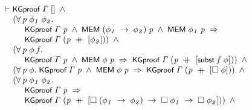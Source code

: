 \documentclass{report}
\renewcommand{\HOLConst}[1]{{\textsf{\upshape\small #1}}}
\newenvironment{holmath}{\begin{displaymath}\begin{array}{l}}{\end{array}\end{displaymath}\ignorespacesafterend}
\begin{document}
\begin{holmath}
  \ensuremath{\HOLTokenTurnstile}\HOLConst{KGproof}\;\HOLFreeVar{\ensuremath{\Gamma}}\;[]\;\HOLSymConst{\HOLTokenConj{}}\\
\;\;\;\;\;(\HOLSymConst{\HOLTokenForall{}}\HOLBoundVar{p}\;\HOLBoundVar{\ensuremath{\phi\sb{1}}}\;\HOLBoundVar{\ensuremath{\phi\sb{2}}}.\\
\;\;\;\;\;\;\;\;\;\;\HOLConst{KGproof}\;\HOLFreeVar{\ensuremath{\Gamma}}\;\HOLBoundVar{p}\;\HOLSymConst{\HOLTokenConj{}}\;\HOLConst{MEM}\;(\HOLBoundVar{\ensuremath{\phi\sb{1}}}\;\HOLSymConst{\ensuremath{\rightarrow}}\;\HOLBoundVar{\ensuremath{\phi\sb{2}}})\;\HOLBoundVar{p}\;\HOLSymConst{\HOLTokenConj{}}\;\HOLConst{MEM}\;\HOLBoundVar{\ensuremath{\phi\sb{1}}}\;\HOLBoundVar{p}\;\HOLSymConst{\HOLTokenImp{}}\\
\;\;\;\;\;\;\;\;\;\;\HOLConst{KGproof}\;\HOLFreeVar{\ensuremath{\Gamma}}\;(\HOLBoundVar{p}\;\HOLSymConst{\HOLTokenDoublePlus}\;[\HOLBoundVar{\ensuremath{\phi\sb{2}}}]))\;\HOLSymConst{\HOLTokenConj{}}\\
\;\;\;\;\;(\HOLSymConst{\HOLTokenForall{}}\HOLBoundVar{p}\;\HOLBoundVar{\ensuremath{\phi}}\;\HOLBoundVar{f}.\\
\;\;\;\;\;\;\;\;\;\;\HOLConst{KGproof}\;\HOLFreeVar{\ensuremath{\Gamma}}\;\HOLBoundVar{p}\;\HOLSymConst{\HOLTokenConj{}}\;\HOLConst{MEM}\;\HOLBoundVar{\ensuremath{\phi}}\;\HOLBoundVar{p}\;\HOLSymConst{\HOLTokenImp{}}\;\HOLConst{KGproof}\;\HOLFreeVar{\ensuremath{\Gamma}}\;(\HOLBoundVar{p}\;\HOLSymConst{\HOLTokenDoublePlus}\;[\HOLConst{subst}\;\HOLBoundVar{f}\;\HOLBoundVar{\ensuremath{\phi}}]))\;\HOLSymConst{\HOLTokenConj{}}\\
\;\;\;\;\;(\HOLSymConst{\HOLTokenForall{}}\HOLBoundVar{p}\;\HOLBoundVar{\ensuremath{\phi}}.\;\HOLConst{KGproof}\;\HOLFreeVar{\ensuremath{\Gamma}}\;\HOLBoundVar{p}\;\HOLSymConst{\HOLTokenConj{}}\;\HOLConst{MEM}\;\HOLBoundVar{\ensuremath{\phi}}\;\HOLBoundVar{p}\;\HOLSymConst{\HOLTokenImp{}}\;\HOLConst{KGproof}\;\HOLFreeVar{\ensuremath{\Gamma}}\;(\HOLBoundVar{p}\;\HOLSymConst{\HOLTokenDoublePlus}\;[\HOLSymConst{\ensuremath{\Box}}\;\HOLBoundVar{\ensuremath{\phi}}]))\;\HOLSymConst{\HOLTokenConj{}}\\
\;\;\;\;\;(\HOLSymConst{\HOLTokenForall{}}\HOLBoundVar{p}\;\HOLBoundVar{\ensuremath{\phi\sb{1}}}\;\HOLBoundVar{\ensuremath{\phi\sb{2}}}.\\
\;\;\;\;\;\;\;\;\;\;\HOLConst{KGproof}\;\HOLFreeVar{\ensuremath{\Gamma}}\;\HOLBoundVar{p}\;\HOLSymConst{\HOLTokenImp{}}\\
\;\;\;\;\;\;\;\;\;\;\HOLConst{KGproof}\;\HOLFreeVar{\ensuremath{\Gamma}}\;(\HOLBoundVar{p}\;\HOLSymConst{\HOLTokenDoublePlus}\;[\HOLSymConst{\ensuremath{\Box}}\;(\HOLBoundVar{\ensuremath{\phi\sb{1}}}\;\HOLSymConst{\ensuremath{\rightarrow}}\;\HOLBoundVar{\ensuremath{\phi\sb{2}}})\;\HOLSymConst{\ensuremath{\rightarrow}}\;\HOLSymConst{\ensuremath{\Box}}\;\HOLBoundVar{\ensuremath{\phi\sb{1}}}\;\HOLSymConst{\ensuremath{\rightarrow}}\;\HOLSymConst{\ensuremath{\Box}}\;\HOLBoundVar{\ensuremath{\phi\sb{2}}}]))\;\HOLSymConst{\HOLTokenConj{}}\\

\end{holmath}
\end{document}
